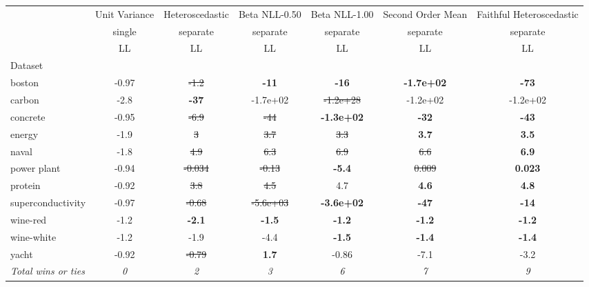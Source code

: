 \begin{tabular}{l|c|c|c|c|c|c}
\toprule
{} & {Unit Variance} & {Heteroscedastic} & {Beta NLL-0.50} & {Beta NLL-1.00} & {Second Order Mean} & {Faithful Heteroscedastic} \\
{} & {single} & {separate} & {separate} & {separate} & {separate} & {separate} \\
{} & {LL} & {LL} & {LL} & {LL} & {LL} & {LL} \\
{Dataset} & {} & {} & {} & {} & {} & {} \\
\midrule
boston & -0.97 & \sout{-1.2} & \textbf{-11} & \textbf{-16} & \textbf{-1.7e+02} & \textbf{-73} \\
carbon & -2.8 & \textbf{-37} & -1.7e+02 & \sout{-1.2e+28} & -1.2e+02 & -1.2e+02 \\
concrete & -0.95 & \sout{-6.9} & \sout{-44} & \textbf{-1.3e+02} & \textbf{-32} & \textbf{-43} \\
energy & -1.9 & \sout{3} & \sout{3.7} & \sout{3.3} & \textbf{3.7} & \textbf{3.5} \\
naval & -1.8 & \sout{4.9} & \sout{6.3} & \sout{6.9} & \sout{6.6} & \textbf{6.9} \\
power plant & -0.94 & \sout{-0.034} & \sout{-0.13} & \textbf{-5.4} & \sout{0.009} & \textbf{0.023} \\
protein & -0.92 & \sout{3.8} & \sout{4.5} & 4.7 & \textbf{4.6} & \textbf{4.8} \\
superconductivity & -0.97 & \sout{-0.68} & \sout{-5.6e+03} & \textbf{-3.6e+02} & \textbf{-47} & \textbf{-14} \\
wine-red & -1.2 & \textbf{-2.1} & \textbf{-1.5} & \textbf{-1.2} & \textbf{-1.2} & \textbf{-1.2} \\
wine-white & -1.2 & -1.9 & -4.4 & \textbf{-1.5} & \textbf{-1.4} & \textbf{-1.4} \\
yacht & -0.92 & \sout{-0.79} & \textbf{1.7} & -0.86 & -7.1 & -3.2 \\
\textit{{Total wins or ties}} & \textit{0} & \textit{2} & \textit{3} & \textit{6} & \textit{7} & \textit{9} \\
\bottomrule
\end{tabular}

